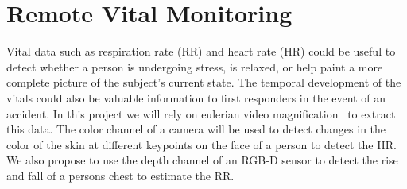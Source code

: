 


\section{Remote Vital Monitoring}

Vital data such as respiration rate (RR) and heart rate (HR) could be useful to detect whether a person is undergoing stress, is relaxed, or help paint a more complete picture of the subject's current state. The temporal development of the vitals could also be valuable information to first responders in the event of an accident.
In this project we will rely on eulerian video magnification~\cite{Wu12Eulerian} to extract this data. The color channel of a camera will be used to detect changes in the color of the skin at different keypoints on the face of a person to detect the HR.
We also propose to use the depth channel of an RGB-D sensor to detect the rise and fall of a persons chest to estimate the RR.

